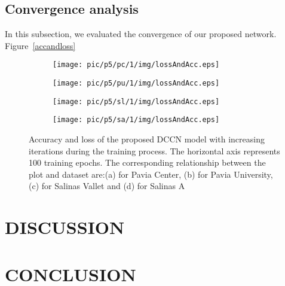 \documentclass{article}
\begin{document}
	\subsection{Convergence analysis}\label{subsec:convergence}
	In this subsection, we evaluated the convergence of our proposed network.
	Figure~\ref{accandloss}
	\begin{figure}[htb]
		\begin{subfigure}{0.24\textwidth}
			\texttt{[image: pic/p5/pc/1/img/lossAndAcc.eps]}
			\caption{}
		\end{subfigure}
		\begin{subfigure}{0.24\textwidth}
			\texttt{[image: pic/p5/pu/1/img/lossAndAcc.eps]}
			\caption{}
		\end{subfigure}
		\begin{subfigure}{0.24\textwidth}
			\texttt{[image: pic/p5/sl/1/img/lossAndAcc.eps]}
			\caption{}
		\end{subfigure}
		\begin{subfigure}{0.24\textwidth}
			\texttt{[image: pic/p5/sa/1/img/lossAndAcc.eps]}
			\caption{}
		\end{subfigure}
		\caption{Accuracy and loss of the proposed DCCN model with increasing iterations during the training process.
		The horizontal axis represents 100 training epochs.
		The corresponding relationship between the plot and dataset are:(a) for Pavia Center, (b) for Pavia University,
			(c) for Salinas Vallet and (d) for Salinas A}
	\end{figure}\label{accandloss}


	\section{DISCUSSION}\label{sec:discussion}


	\section{CONCLUSION}\label{sec:conclusion}


	
\end{document}
